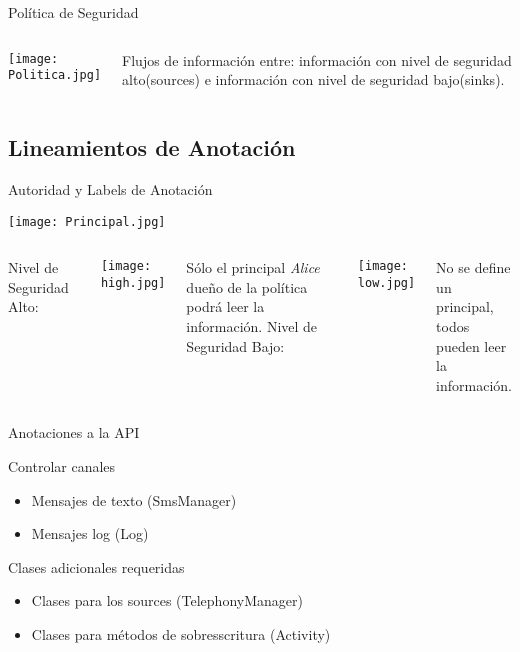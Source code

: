 \begin{frame}{Política de Seguridad}
	\begin{columns}[c]
	\column{1.5in}
	\begin{center}
	\texttt{[image: Politica.jpg]} 
	\end{center}
	\column{1.5in}
	Flujos de información entre: información con nivel de seguridad alto(sources) e
	información con nivel de seguridad bajo(sinks).
	\end{columns}
\end{frame}

\subsection{Lineamientos de Anotación} 
\begin{frame}{Autoridad y Labels de Anotación}
	\begin{center}
	\texttt{[image: Principal.jpg]}
	\end{center}
	\begin{columns}[T]
	\column{2in}
	Nivel de Seguridad Alto:
	\begin{center}
	\vspace{-0.5em}
	\texttt{[image: high.jpg]}\newline
	\vspace{-1.5em}
	\end{center}
	Sólo el principal \emph{Alice}\\ dueño de la política \\ podrá leer la
	información.
	\column{2in}
	Nivel de Seguridad Bajo:
	\begin{center}
	\vspace{-0.5em} 
	\texttt{[image: low.jpg]}\newline
	\vspace{-1.5em}
	\end{center}
	No se define un principal,\\
	todos pueden leer\\
	la información.
	\end{columns}
\end{frame}	
\begin{frame}{Anotaciones a la API} %
	\begin{block}{Controlar canales} 
	\begin{itemize}
	  \item Mensajes de texto (SmsManager)
	  \item Mensajes log (Log)
	\end{itemize} 
	\end{block}
	\pause
	\begin{block}{Clases adicionales requeridas}
		\begin{itemize}
		  \item Clases para los sources (TelephonyManager)
		  \item Clases para métodos de sobresscritura (Activity)
		\end{itemize}
	\end{block}
\end{frame}	

